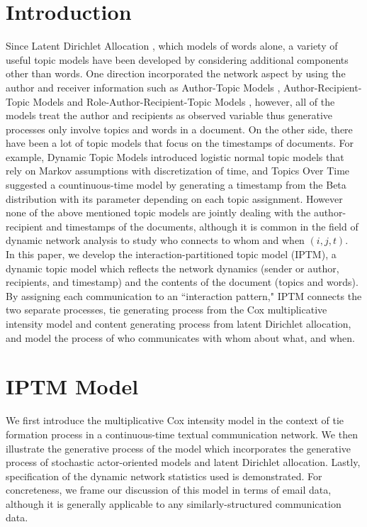 \documentclass[a4paper]{article}
\begin{document}
\section{Introduction} \label{sec: Introduction}
Since Latent Dirichlet Allocation \citep{Blei2003}, which models of words alone, a variety of useful topic models have been developed by considering additional components other than words. One direction incorporated the network aspect by using the author and receiver information such as Author-Topic Models \citep{rosen2004author}, Author-Recipient-Topic Models and Role-Author-Recipient-Topic Models \citep{mccallum2005topic}, however, all of the models treat the author and recipients as observed variable thus generative processes only involve topics and words in a document. On the other side, there have been a lot of topic
models that focus on the timestamps of documents. For example, Dynamic Topic Models \citep{blei2006dynamic} introduced logistic normal topic models that rely on Markov assumptions with discretization of time, and Topics Over Time \citep{wang2006topics} suggested a countinuous-time model by generating a timestamp from the Beta distribution with its parameter depending on each topic assignment. However none of the above mentioned topic models are jointly dealing with the author-recipient and timestamps of the documents, although it is common in the field of dynamic network analysis to study who connects to whom and when $(i, j, t)$. \\ \newline
In this paper, we develop the interaction-partitioned topic model (IPTM), a dynamic topic model which reflects the network dynamics (sender or author, recipients, and timestamp) and the contents of the document (topics and words). By assigning each communication to an
``interaction pattern," IPTM connects the two separate processes, tie generating process from the Cox multiplicative intensity model and content generating process from latent Dirichlet allocation, and model the process of who communicates with whom about what, and when. 
\section{IPTM Model} \label{sec: IPTM Model}
We first introduce the multiplicative Cox intensity model in the context of tie formation process in a continuous-time textual communication network. We then illustrate the generative process of the model which incorporates the generative process of stochastic actor-oriented models and latent Dirichlet allocation. Lastly, specification of the dynamic network statistics used is demonstrated. For concreteness, we frame our discussion of this model in terms of email data, although it is generally applicable to any similarly-structured communication data.
\end{document}
